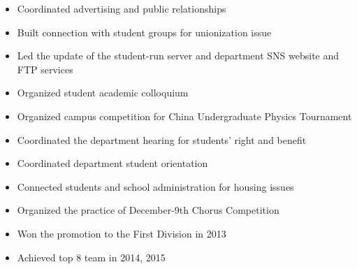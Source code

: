 \documentclass[localFont,alternative]{yaac-another-awesome-cv}
\begin{document}
\begin{minipage}{\linewidth}
\begin{itemize}[leftmargin=2em]
	\item Coordinated advertising and public relationships
	\item Built connection with student groups for unionization issue
\end{itemize}
\end{minipage}
\begin{minipage}{\linewidth}
\begin{itemize}[leftmargin=2em]
	\item Led the update of the student-run server and department SNS 
	website and FTP services
	\item Organized student academic colloquium
	\item Organized campus competition for China Undergraduate Physics Tournament
\end{itemize}
\end{minipage}
\begin{minipage}{\linewidth}
\begin{itemize}[leftmargin=2em]
	\item Coordinated the department hearing for students' right and benefit
	\item Coordinated department student orientation
	\item Connected students and school administration for housing issues
	\item Organized the practice of December-9th Chorus Competition
\end{itemize}
\end{minipage}
\begin{minipage}{\linewidth}
\begin{itemize}[leftmargin=2em]
	\item Won the promotion to the First Division in 2013
	\item Achieved top 8 team in 2014, 2015
\end{itemize}
\end{minipage}
\end{document}
